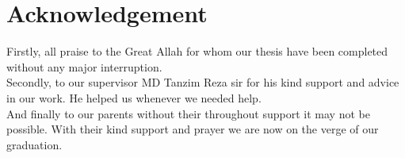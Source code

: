 \section*{Acknowledgement}
Firstly, all praise to the Great Allah for whom our thesis have been completed without any major interruption.\\
Secondly, to our supervisor MD Tanzim Reza sir for his kind support and advice in our work. He helped us whenever we needed help.\\
And finally to our parents without their throughout support it may not be possible. With their kind support and prayer we are now on the verge of our graduation.